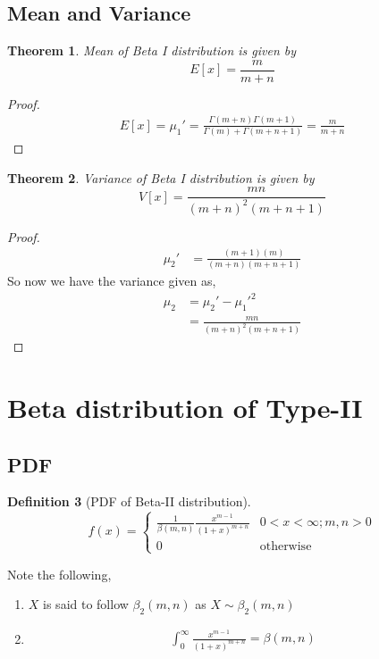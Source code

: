 \documentclass[oneside,11pt,pdftex]{book}%
\numberwithin{equation}{section}
\newtheorem{theorem}{Theorem}[chapter]%
\newtheorem{definition}[theorem]{Definition}
\numberwithin{section}{chapter}
\numberwithin{equation}{chapter}
\begin{document}
\subsection{Mean and Variance}
\begin{theorem}
	Mean of Beta I distribution is given by \[ E[x]=\frac{m}{m+n} \]
\end{theorem}
\begin{proof}
	\begin{align*}
		E[x]=\mu_1'=\frac{\Gamma(m+n)\Gamma(m+1)}{\Gamma(m)+\Gamma(m+n+1)}=\frac{m}{m+n}
	\end{align*}
\end{proof}

\begin{theorem}
	Variance of Beta I distribution is given by \[ V[x]=\frac{mn}{(m+n)^2(m+n+1)} \]
\end{theorem}
\begin{proof}
	\begin{align*}
		\mu_2'&=\frac{(m+1)(m)}{(m+n)(m+n+1)}
	\end{align*}
So now we have the variance given as,
\begin{align*}
	\mu_2&=\mu_2'-\mu_1'^2\\
	&=\frac{mn}{(m+n)^2(m+n+1)}
\end{align*}
\end{proof}

\section{Beta distribution of Type-II}
\subsection{PDF}
\begin{definition}[PDF of Beta-II distribution]
	\[ f(x)=\begin{cases}
		\frac{1}{\beta(m,n)}\frac{x^{m-1}}{(1+x)^{m+n}} & 0<x<\infty; m,n>0\\
		0 & \text{otherwise}
	\end{cases} \]
\end{definition}
Note the following,
\begin{enumerate}
	\item $ X $ is said to follow $ \beta_2(m,n) $ as $ X \sim \beta_2(m,n) $
	\item \begin{align*}
	\int_0^\infty \frac{x^{m-1}}{(1+x)^{m+n}}=\beta(m,n)
	\end{align*}
\end{enumerate}
\end{document}

